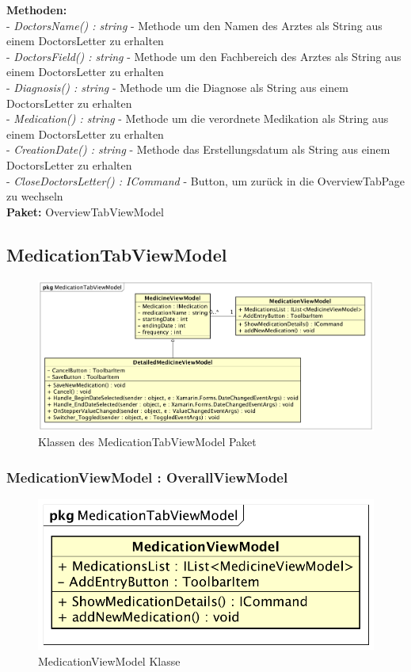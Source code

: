 \documentclass[a4paper]{scrreprt}
\begin{document}
\textbf{Methoden:}\\
- \textit{DoctorsName() : string} - Methode um den Namen des Arztes als String aus einem DoctorsLetter zu erhalten\\
- \textit{DoctorsField() : string} - Methode um den Fachbereich des Arztes als String aus einem DoctorsLetter zu erhalten\\
- \textit{Diagnosis() : string} - Methode um die Diagnose als String aus einem DoctorsLetter zu erhalten\\
- \textit{Medication() : string} - Methode um die verordnete Medikation als String aus einem DoctorsLetter zu erhalten\\
- \textit{CreationDate() : string} - Methode das Erstellungsdatum als String aus einem DoctorsLetter zu erhalten\\
- \textit{CloseDoctorsLetter() : ICommand} - Button, um zurück in die OverviewTabPage zu wechseln\\

\textbf{Paket:} OverviewTabViewModel

\subsection{MedicationTabViewModel}
\begin{figure}[H]
\centering
\includegraphics[width=0.75\textheight]{graphics/Klassendiagramme/ViewModel/MedicationTabViewModel.png}
\caption{Klassen des MedicationTabViewModel Paket}
\end{figure}

\subsubsection{MedicationViewModel : OverallViewModel}
\begin{figure}[H]
\centering
\includegraphics[width=0.65\textheight]{graphics/Klassendiagramme/ViewModel/MedicationViewModel.png}
\caption{MedicationViewModel Klasse}
\end{figure}
\end{document}
